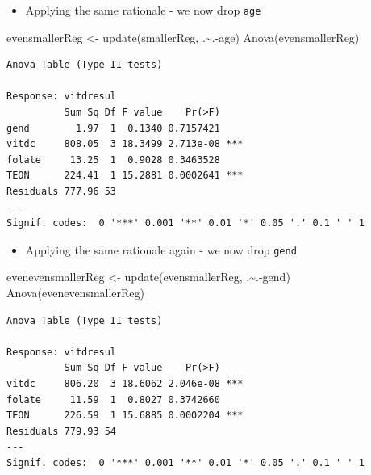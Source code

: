 \documentclass[
  oneside]{krantz}
\newenvironment{Shaded}{\begin{snugshade}}{\end{snugshade}}
\newcommand{\FunctionTok}[1]{\textcolor[rgb]{0.00,0.00,0.00}{#1}}
\newcommand{\NormalTok}[1]{#1}
\newcommand{\OtherTok}[1]{\textcolor[rgb]{0.56,0.35,0.01}{#1}}
\newcommand{\SpecialCharTok}[1]{\textcolor[rgb]{0.00,0.00,0.00}{#1}}
\providecommand{\tightlist}{%
  \setlength{\itemsep}{0pt}\setlength{\parskip}{0pt}}
\begin{document}
\begin{itemize}
\tightlist
\item
  Applying the same rationale - we now drop \texttt{age}
\end{itemize}

\begin{Shaded}
\begin{Highlighting}[]
\NormalTok{evensmallerReg }\OtherTok{\textless{}{-}} \FunctionTok{update}\NormalTok{(smallerReg, .}\SpecialCharTok{\textasciitilde{}}\NormalTok{.}\SpecialCharTok{{-}}\NormalTok{age)}
\FunctionTok{Anova}\NormalTok{(evensmallerReg)}
\end{Highlighting}
\end{Shaded}

\begin{verbatim}
Anova Table (Type II tests)

Response: vitdresul
          Sum Sq Df F value    Pr(>F)    
gend        1.97  1  0.1340 0.7157421    
vitdc     808.05  3 18.3499 2.713e-08 ***
folate     13.25  1  0.9028 0.3463528    
TEON      224.41  1 15.2881 0.0002641 ***
Residuals 777.96 53                      
---
Signif. codes:  0 '***' 0.001 '**' 0.01 '*' 0.05 '.' 0.1 ' ' 1
\end{verbatim}

\begin{itemize}
\tightlist
\item
  Applying the same rationale again - we now drop \texttt{gend}
\end{itemize}

\begin{Shaded}
\begin{Highlighting}[]
\NormalTok{evenevensmallerReg }\OtherTok{\textless{}{-}} \FunctionTok{update}\NormalTok{(evensmallerReg, .}\SpecialCharTok{\textasciitilde{}}\NormalTok{.}\SpecialCharTok{{-}}\NormalTok{gend)}
\FunctionTok{Anova}\NormalTok{(evenevensmallerReg)}
\end{Highlighting}
\end{Shaded}

\begin{verbatim}
Anova Table (Type II tests)

Response: vitdresul
          Sum Sq Df F value    Pr(>F)    
vitdc     806.20  3 18.6062 2.046e-08 ***
folate     11.59  1  0.8027 0.3742660    
TEON      226.59  1 15.6885 0.0002204 ***
Residuals 779.93 54                      
---
Signif. codes:  0 '***' 0.001 '**' 0.01 '*' 0.05 '.' 0.1 ' ' 1
\end{verbatim}
\end{document}
